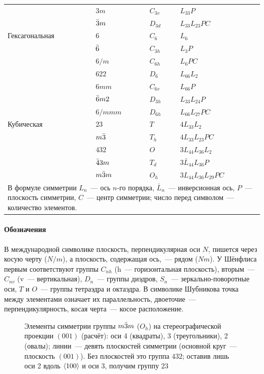 \begin{table}[p]
\begin{tabular}{@{}llll@{}}
 & $3m$ & $C_{3v}$ & $L_33P$\\
 & $\bar{3}m$ & $D_{3d}$ & $L_33L_23PC$\\
\midrule
Гексагональная & $6$ & $C_6$ & $L_6$\\
 & $\bar{6}$ & $C_{3h}$ & $L_3P$\\
 & $6/m$ & $C_{6h}$ & $L_6PC$\\
 & $622$ & $D_6$ & $L_66L_2$\\
 & $6mm$ & $C_{6v}$ & $L_66P$\\
 & $\bar{6}m2$ & $D_{3h}$ & $L_33L_24P$\\
 & $6/mmm$ & $D_{6h}$ & $L_66L_27PC$\\
\midrule
Кубическая & $23$ & $T$ & $4L_33L_2$\\
 & $m\bar{3}$ & $T_h$ & $4L_33L_23PC$\\
 & $432$ & $O$ & $3L_44L_36L_2$\\
 & $\bar{4}3m$ & $T_d$ & $3\bar L_44L_36P$\\
 & $m\bar{3}m$ & $O_h$ & $3L_44L_36L_29PC$\\
\bottomrule
\multicolumn{4}{p{0.8\textwidth}}{\footnotesize В формуле симметрии $L_n$~— ось $n$-го порядка, $\bar L_n$~— инверсионная ось, $P$~— плоскость симметрии, $C$~— центр симметрии; число перед символом~— количество элементов.}
\end{tabular}
\end{table}

\paragraph{Обозначения}
В международной символике плоскость, перпендикулярная оси $N$, пишется
через косую черту ($N/m$), а плоскость, содержащая ось,~— рядом ($Nm$).
У Шёнфлиса первым соответствуют группы $C_{nh}$ (h~— горизонтальная
плоскость), вторым~— $C_{nv}$ (v~— вертикальная), $D_n$~— группы диэдров,
$S_n$~— зеркально-поворотные оси, $T$ и $O$~— группы тетраэдра и
октаэдра. В символике Шубникова точка между элементами означает их
параллельность, двоеточие~— перпендикулярность, косая черта~— косое
расположение.

\begin{figure}[ht]
\centering
{}
\caption{Элементы симметрии группы $m\bar{3}m$ ($O_h$) на стереографической
проекции $(001)$ (расчёт): оси 4 (квадраты), 3 (треугольники), 2 (овалы);
линии~— девять плоскостей симметрии (основной круг~— плоскость $(001)$).
Без плоскостей это группа $432$; оставив лишь оси 2 вдоль $\langle 100\rangle$ и
оси 3, получим группу $23$}
\label{fig:m3m}
\end{figure}

